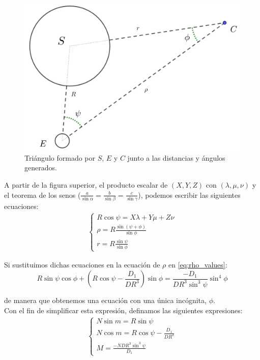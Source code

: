 \documentclass[11pt]{article}
\newcommand\ddfrac[2]{\frac{\displaystyle #1}{\displaystyle #2}}
\begin{document}
\begin{figure}[H]
\centering
\includegraphics[scale=0.15]{images/notation_angles.png}
\caption{Triángulo formado por $S$, $E$ y $C$ junto a las distancias y ángulos generados.}
\label{fig:notation_angles}
\end{figure}

A partir de la figura superior, el producto escalar de $(X,Y,Z)$ con $(\lambda,\mu,\nu)$ y el teorema de los senos ($\ddfrac{a}{\sin{\alpha}}=\ddfrac{b}{\sin{\beta}}=\ddfrac{c}{\sin{\gamma}}$), podemos escribir las siguientes ecuaciones:
\begin{align}
\left\{
\begin{array}{l}
	R\cos{\psi}=X\lambda+Y\mu+Z\nu\\
	\rho=R\ddfrac{\sin{(\psi+\phi)}}{\sin{\phi}}\\
	r=R\ddfrac{\sin{\psi}}{\sin{\phi}}
\end{array}
\right.
\label{eq:triangle_relations}
\end{align}

Si sustituimos dichas ecuaciones en la ecuación de $\rho$ en \eqref{eq:rho_values}:
\[
R\sin{\psi}\cos{\phi}+\left(R\cos{\psi}-\ddfrac{D_1}{DR^3}\right)\sin{\phi}=\ddfrac{-D_1}{DR^3\sin^3{\psi}}\sin^4{\phi}
\]

\noindent de manera que obtenemos una ecuación con una única incógnita, $\phi$.\\

Con el fin de simplificar esta expresión, definamos las siguientes expresiones:
\begin{align}
\left\{
\begin{array}{l}
	N\sin{m}=R\sin{\psi}\\
	N\cos{m}=R\cos{\psi}-\ddfrac{D_1}{DR^3}\\
	M=\ddfrac{-NDR^3\sin^3{\psi}}{D_1}
\end{array}
\right.
\label{eq:to_simplify}
\end{align}
\end{document}
